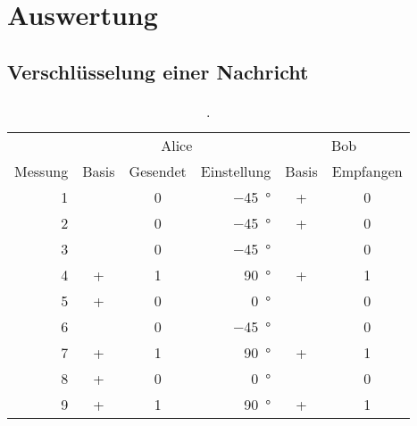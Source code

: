 \section{Auswertung}

\subsection{Verschlüsselung einer Nachricht}

\begin{longtable}[c]{rccrcc}
	\caption{.}
	\label{tab:schluessel}
	\\
	\toprule
	& \multicolumn{3}{c}{Alice} & \multicolumn{2}{c}{Bob} \\
	\cmidrule(lr){2-4}\cmidrule(lr){5-6}
	{Messung} & {Basis} & {Gesendet} & {Einstellung} & {Basis} & {Empfangen} \\
	\midrule
	 1\hspace{1.5em} & \times & 0 & \qty{-45}{\degree}\hspace{1.5em} &      + & 0 \\
	 2\hspace{1.5em} & \times & 0 & \qty{-45}{\degree}\hspace{1.5em} &      + & 0 \\
	 3\hspace{1.5em} & \times & 0 & \qty{-45}{\degree}\hspace{1.5em} & \times & 0 \\
	 4\hspace{1.5em} &      + & 1 & \qty{ 90}{\degree}\hspace{1.5em} &      + & 1 \\
	 5\hspace{1.5em} &      + & 0 & \qty{  0}{\degree}\hspace{1.5em} & \times & 0 \\
	 6\hspace{1.5em} & \times & 0 & \qty{-45}{\degree}\hspace{1.5em} & \times & 0 \\
	 7\hspace{1.5em} &      + & 1 & \qty{ 90}{\degree}\hspace{1.5em} &      + & 1 \\
	 8\hspace{1.5em} &      + & 0 & \qty{  0}{\degree}\hspace{1.5em} & \times & 0 \\
	 9\hspace{1.5em} &      + & 1 & \qty{ 90}{\degree}\hspace{1.5em} &      + & 1 \\

\end{longtable}

